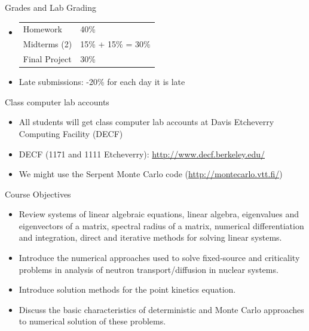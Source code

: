 \documentclass[xcolor=x11names,compress]{beamer}
\renewcommand{\(}{\begin{columns}}
\renewcommand{\)}{\end{columns}}
\newcommand{\<}[1]{\begin{column}{#1}}
\renewcommand{\>}{\end{column}}
\begin{document}
\begin{frame}{Grades and Lab}
Grading
\begin{itemize}
\item \begin{tabular}{ll}
Homework & 40\% \\
Midterms (2) & 15\% + 15\% = 30\% \\
Final Project & 30\% 
\end{tabular}
\item Late submissions: -20\% for each day it is late
\end{itemize}
Class computer lab accounts
\begin{itemize}
\item All students will get class computer lab accounts at Davis Etcheverry Computing Facility (DECF)
\item DECF (1171 and 1111 Etcheverry): \href{http://www.decf.berkeley.edu/}{http://www.decf.berkeley.edu/}
\item We might use the Serpent Monte Carlo code (\href{http://montecarlo.vtt.fi/}{http://montecarlo.vtt.fi/})
\end{itemize}
\end{frame}

\begin{frame}{Course Objectives}
\begin{itemize}
\item Review systems of linear algebraic equations, linear algebra, eigenvalues and eigenvectors of a matrix, spectral radius of a matrix, numerical differentiation and integration, direct and iterative methods for solving linear systems.
\item Introduce the numerical approaches used to solve fixed-source and criticality problems in analysis of neutron transport/diffusion in nuclear systems.
\item Introduce solution methods for the point kinetics equation.
\item Discuss the basic characteristics of deterministic and Monte Carlo approaches to numerical solution of these problems.
\end{itemize}
\end{frame}
\end{document}
